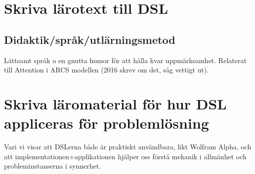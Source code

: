 \begin{binge}
  \section{Skriva lärotext till DSL}

  \subsection{Didaktik/språk/utlärningsmetod}

  Lättsamt språk o en gnutta humor för att hålla kvar
  uppmärksamhet. Relaterat till Attention i ARCS modellen (2016 skrev om
  det, såg vettigt ut).

  \section{Skriva läromaterial för hur DSL appliceras för problemlösning}

  Vari vi visar att DSLerna både är praktiskt användbara, likt Wolfram
  Alpha, och att implementationen+applikationen hjälper oss förstå
  mekanik i allmänhet och probleminstanserna i synnerhet.

\end{binge}

